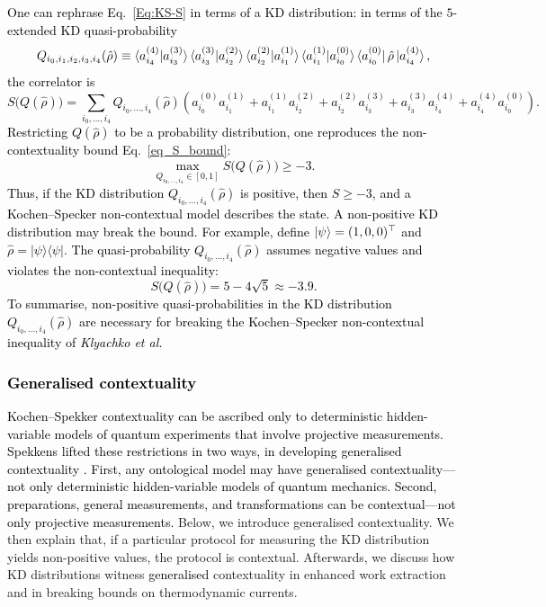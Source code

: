 \documentclass[%
 reprint,
superscriptaddress,
nofootinbib,
bibnotes,
 amsmath,amssymb,
 aps,
]{revtex4-1}
\theoremstyle{plain}
\newcommand*{\ketbra}[2]{\lvert #1 \rangle\!\langle #2 \rvert}
\newcommand{\Dave}[1]{\textcolor{black}{#1} }
\newcommand{\nicole}[1]{\textcolor{black}{#1} }
\begin{document}
\nicole{
One can rephrase Eq.~\eqref{Eq:KS-S} in terms of a KD distribution:
in terms of the $5$-extended KD quasi-probability
\begin{equation}
Q_{i_0,i_1,i_2,i_3, i_4} (\hat{\rho}) \equiv  \braket{a_{i_4}^{(4)} | a_{i_{3}}^{(3)}} \braket{a_{i_{3}}^{(3)} | a_{i_{2}}^{(2)}}  \braket{a_{i_{2}}^{(2)} | a_{i_{1}}^{(1)}}   \braket{a_{i_{1}}^{(1)} | a_{i_{0}}^{(0)} }  \bra{a_{i_{0}}^{(0)}} \hat{\rho} \ket{a_{i_{4}}^{(4)}} ,
\end{equation}
the correlator is
\begin{equation}
S\bm{(} Q(\hat{\rho}) \bm{)} =  \sum_{i_0,\ldots, i_4} Q_{i_0,\ldots, i_4} (\hat{\rho})  \left( a^{(0)}_{i_0} a^{(1)}_{i_1} + a^{(1)}_{i_1} a^{(2)}_{i_2} + a^{(2)}_{i_2} a^{(3)}_{i_3} + a^{(3)}_{i_3} a^{(4)}_{i_4} + a^{(4)}_{i_4} a^{(0)}_{i_0} \right)  .
\end{equation}
Restricting $Q(\hat{\rho})$ to be a probability distribution, one reproduces the non-contextuality bound Eq.~\eqref{eq_S_bound}:
\begin{equation}
\max_{Q_{i_0,\ldots, i_4}  \in [0,1]} S\bm{(} Q(\hat{\rho}) \bm{)}  \geq -3 .
\end{equation}
Thus, if the KD distribution $Q_{i_0,\ldots, i_4} (\hat{\rho})$ is positive, 
then $S \geq -3$, and a Kochen--Specker non-contextual model describes the state. A non-positive KD distribution may break the bound. For example, define 
$\ket{\psi} = (1,0,0)^{\top}$ and $\hat{\rho} = \ketbra{\psi}{\psi}$. 
The quasi-probability $Q_{i_0,\ldots, i_4} (\hat{\rho})$ assumes negative values and violates the non-contextual inequality:
\begin{equation}
S\bm{(} Q(\hat{\rho}) \bm{)}  = 5 - 4 \sqrt{5} \approx -3.9 .
\end{equation} 
To summarise, non-positive quasi-probabilities in the KD distribution $Q_{i_0,\ldots, i_4} (\hat{\rho})$ are necessary for breaking the Kochen--Specker non-contextual inequality of \emph{Klyachko et al.}
}




\subsubsection{\Dave{Generalised contextuality}}
\label{SubSec:GenContext}
\nicole{
Kochen--Spekker contextuality can be ascribed only to \Dave{deterministic hidden-variable models of quantum experiments that involve projective measurements.} 
Spekkens lifted these restrictions in two ways, in developing generalised contextuality \cite{spekkens2005contextuality}. First, any ontological model may have generalised contextuality---not only deterministic hidden-variable models of quantum mechanics. Second, preparations, general measurements, and transformations can be contextual---not only projective measurements.
}
Below, we introduce generalised contextuality. We then explain that, if a particular protocol for measuring the KD distribution yields non-positive values, the protocol is contextual.
Afterwards, we discuss how  KD distributions  witness \Dave{generalised} contextuality in enhanced work extraction and in breaking bounds on thermodynamic currents.
\end{document}
